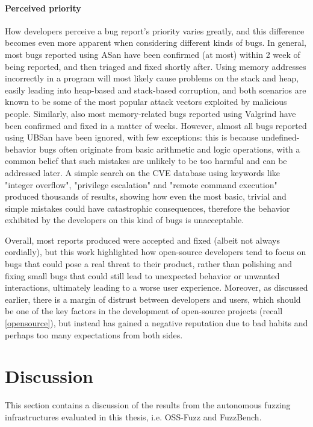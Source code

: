 \paragraph{Perceived priority} How developers perceive a bug report's priority varies greatly, and this difference becomes even more apparent when considering different kinds of bugs. In general, most bugs reported using ASan have been confirmed (at most) within 2 week of being reported, and then triaged and fixed shortly after. Using memory addresses incorrectly in a program will most likely cause problems on the stack and heap, easily leading into heap-based and stack-based corruption, and both scenarios are known to be some of the most popular attack vectors exploited by malicious people. Similarly, also most memory-related bugs reported using Valgrind have been confirmed and fixed in a matter of weeks. However, almost all bugs reported using UBSan have been ignored, with few exceptions: this is because undefined-behavior bugs often originate from basic arithmetic and logic operations, with a common belief that such mistakes are unlikely to be too harmful and can be addressed later. A simple search on the CVE database \cite{cve} using keywords like "integer overflow", "privilege escalation" and "remote command execution" produced thousands of results, showing how even the most basic, trivial and simple mistakes could have catastrophic consequences, therefore the behavior exhibited by the developers on this kind of bugs is unacceptable. 

Overall, most reports produced were accepted and fixed (albeit not always cordially), but this work highlighted how open-source developers tend to focus on bugs that could pose a real threat to their product, rather than polishing and fixing small bugs that could still lead to unexpected behavior or unwanted interactions, ultimately leading to a worse user experience. Moreover, as discussed earlier, there is a margin of distrust between developers and users, which should be one of the key factors in the development of open-source projects (recall \ref{opensource}), but instead has gained a negative reputation due to bad habits and perhaps too many expectations from both sides.












\newpage
\section{Discussion}
This section contains a discussion of the results from the autonomous fuzzing infrastructures evaluated in this thesis, i.e. OSS-Fuzz and FuzzBench.

